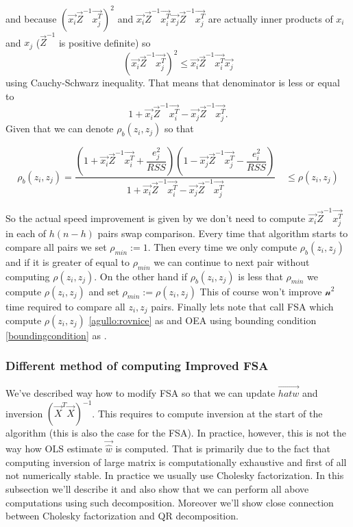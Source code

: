 and because $(\vec{x_i}\vec{Z}^{-1}\vec{x_j^T})^2$ and $\vec{x_i}\vec{Z}^{-1}\vec{x_i^T}\vec{x_j}\vec{Z}^{-1}\vec{x_j^T} $ are actually inner products of $x_i$ and $x_j$  ($\vec{Z}^{-1}$ is positive definite) so 
\begin{equation}
	(\vec{x_i}\vec{Z}^{-1}\vec{x_j^T})^2 \leq \vec{x_i}\vec{Z}^{-1}\vec{x_i^T}\vec{x_j}
\end{equation}
using Cauchy-Schwarz inequality. That means that denominator is less or equal to
\begin{equation}
	1 + \vec{x_i}\vec{Z}^{-1}\vec{x_i^T}  - \vec{x_j}\vec{Z}^{-1}\vec{x_j^T}.
\end{equation}
Given that we can denote $\rho_b(z_i, z_j)$ so that


\begin{equation} \label{boundingcondition}
	\rho_b(z_i, z_j) = \dfrac{(1+\vec{x_i}\vec{Z}^{-1}\vec{x_i^T} + \dfrac{e_j^2}{RSS})
	(1 - \vec{x_j}\vec{Z}^{-1}\vec{x_j^T} - \dfrac{e_i^2}{RSS} )}{1 + \vec{x_i}\vec{Z}^{-1}\vec{x_i^T}  - \vec{x_j}\vec{Z}^{-1}\vec{x_j^T}} \quad \leq \rho(z_i, z_j)
\end{equation}

So the actual speed improvement is given by we don't need to compute $\vec{x_i}\vec{Z}^{-1}\vec{x_j^T}$ in each of $h(n-h)$ pairs swap comparison. Every time that algorithm starts to compare all pairs we set $\rho_{min} :=1$. Then every time we only compute $\rho_b(z_i, z_j)$ and if it is greater of equal to $\rho_{min}$ we can continue to next pair without computing $\rho(z_i, z_j)$. On the other hand if $\rho_b(z_i, z_j)$ is less that  $\rho_{min}$ we compute $\rho(z_i, z_j)$ and set $\rho_{min} := \rho(z_i, z_j)$ This of course won't improve $\mathcal{n^2}$ time required to compare all $z_i, z_j$ pairs.
Finally lets note that \cite{agullo2001new} call FSA  which compute $\rho(z_i, z_j)$  \ref{agullo:rovnice} as  and OEA using bounding condition \ref{boundingcondition} as  .




\subsubsection{Different method of computing Improved FSA}

We've described way how to modify FSA so that we can update $\vec{hat{w}}$ and inversion $(\vec{X}^T \vec{X})^{-1}$. This requires to compute inversion at the start of the algorithm (this is also the case for the FSA). In practice, however, this is not the way how OLS estimate $\vec{\hat{w}}$ is computed. That is primarily due to the fact that computing inversion of large matrix is computationally exhaustive and first of all not numerically stable. In practice we usually use Cholesky factorization. In this subsection we'll describe it and also show that we can perform all above computations using such decomposition. Moreover we'll show close connection between Cholesky factorization and QR decomposition.

